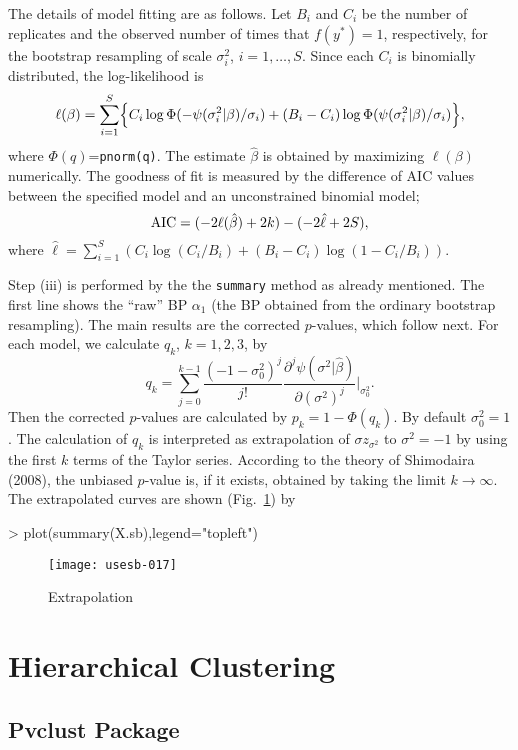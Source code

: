 \documentclass[a4paper]{amsart}
\begin{document}
The details of model fitting are as follows. Let $B_i$ and $C_i$ be
the number of replicates and the observed number of times that
$f(y^*)=1$, respectively, for the bootstrap resampling of scale
$\sigma^2_i$, $i=1,\ldots,S$. Since each $C_i$ is binomially
distributed, the log-likelihood is
\[
\ell(\beta) = \sum_{i=1}^S \Bigl\{
C_i \log \Phi(-\psi(\sigma^2_i|\beta)/\sigma_i)+
(B_i - C_i) \log \Phi(\psi(\sigma^2_i|\beta)/\sigma_i)
\Bigr\},
\]
where $\Phi(q)$={\tt pnorm(q)}. The estimate $\hat\beta$ is obtained
by maximizing $\ell(\beta)$ numerically.  The goodness of fit is
measured by the difference of AIC values between the specified model
and an unconstrained binomial model;
\[
{\rm AIC} = ( -2\ell(\hat\beta)+2k ) - (-2\hat\ell + 2S),
\]
where $\hat\ell = \sum_{i=1}^S ( C_i\log(C_i/B_i) +
(B_i-C_i)\log(1-C_i/B_i)) $.


Step (iii) is performed by the the {\tt summary} method as already
mentioned. The first line shows the ``raw'' BP $\alpha_1$ (the BP
obtained from the ordinary bootstrap resampling).  The main results
are the corrected $p$-values, which follow next. For each model, we
calculate $q_k$, $k=1,2,3$, by
\[
q_k = \sum_{j=0}^{k-1} \frac{(-1-\sigma_0^2)^j}{j!}
\frac{\partial^j \psi(\sigma^2|\hat\beta)}{\partial (\sigma^2)^j}
\Bigr|_{\sigma_0^2}.
\]
Then the corrected $p$-values are calculated by $p_k=1-\Phi(q_k)$.  By
default $\sigma_0^2=1$. The calculation of $q_k$ is interpreted as
extrapolation of $\sigma z_{\sigma^2}$ to $\sigma^2=-1$ by using the
first $k$ terms of the Taylor series. According to the theory of
Shimodaira (2008), the unbiased $p$-value is, if it exists, obtained
by taking the limit $k\to\infty$. The extrapolated curves are shown
(Fig.~\ref{fig:diag1s}) by
\begin{Schunk}
\begin{Sinput}
> plot(summary(X.sb),legend="topleft")
\end{Sinput}
\end{Schunk}
\begin{figure}
\begin{center}
\texttt{[image: usesb-017]}
\caption{Extrapolation}\label{fig:diag1s}
\end{center}
\end{figure}


\section{Hierarchical Clustering}

\subsection{Pvclust Package}
\end{document}
